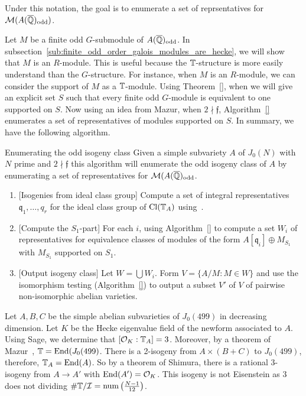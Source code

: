 \documentclass{article}
\renewcommand{\q}{\mathfrak{q}}
\newcommand{\I}{\mathcal{I}}
\newcommand{\odd}{\mathrm{odd}}
\begin{document}
Under this notation, the goal is to enumerate a set of reprsentatives for
$\M(A(\QQbar)_\odd)$. 

Let $M$ be a finite odd $G$-submodule of $A(\QQbar)_\odd$. In
subsection~\ref{sub:finite_odd_order_galois_modules_are_hecke}, we will show
that $M$ is an $R$-module. This is useful because the $\mathbb{T}$-structure is more
easily understand than the $G$-structure. For instance, when $M$ is an
$R$-module, we can consider the support of $M$ as a $\mathbb{T}$-module. Using
Theorem~\ref{}, when we will give an explicit set $S$ such that every finite odd
$G$-module is equivalent to one supported on $S$. Now using an idea from Mazur,
when $2\nmid \mathfrak{f}$, Algorithm~\ref{} enumerates a set of
representatives of modules supported on $S$. In summary, we have the following
algorithm.

\begin{algorithm}{Enumerating the odd isogeny class}
    Given a simple subvariety $A$ of $J_0(N)$ with $N$ prime and $2\nmid
    \mathfrak{f}$ this algorithm will enumerate the odd isogeny class of $A$ by
    enumerating a set of representatives for $\M(A(\QQbar)_\odd$.
    \begin{enumerate}
        \item{} [Isogenies from ideal class group]
            Compute a set of integral representatives $\q_1,\ldots,q_r$ for the
            ideal class group of $\operatorname{Cl}(\mathbb{T}_A)$ using~\cite{}.
        \item{} [Compute the $S_1$-part]
            For each $i$, using Algorithm~\ref{} to compute a set $W_i$ of
            representatives for equivalence classes of modules of the form
            $A[\q_i]\oplus M_{S_1}$ with $M_{S_1}$ supported on $S_1$.
        \item{} [Output isogeny class]
            Let $W=\bigcup W_i$. Form $V=\{A/M:M\in W\}$ and use the
            isomorphism testing (Algorithm~\ref{}) to output a subset $V'$ of
            $V$ of pairwise non-isomorphic abelian varieties.
    \end{enumerate}
\end{algorithm}

\begin{example}
    Let $A,B,C$ be the simple abelian subvarieties of $J_0(499)$ in decreasing
    dimension. Let $K$ be the Hecke
    eigenvalue field of the newform associated to $A$. Using Sage, we
    determine that $[\mathcal{O}_K:\mathbb{T}_A]=3$. Moreover, by a theorem of Mazur~\cite{},
    $\mathbb{T}=\operatorname{End}(J_0(499)$. There is a 2-isogeny from $A\times (B+C)$ to
    $J_0(499)$, therefore, $\mathbb{T}_A=\operatorname{End}(A)$. So by a theorem of Shimura, there
    is a rational 3-isogeny from $A\to A'$ with $\operatorname{End}(A')=\mathcal{O}_K$. This isogeny
    is not Eisenstein as $3$ does not dividing $\# \TT/\I = \mathrm{num}
    \left(\frac{N-1}{12}\right)$.
\end{example}
\end{document}
